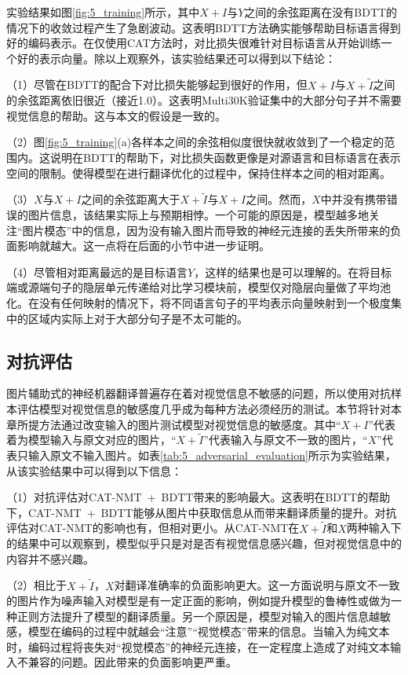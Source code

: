 实验结果如图\ref{fig:5_training}所示，其中$X+I$与$Y$之间的余弦距离在没有BDTT的情况下的收敛过程产生了急剧波动。这表明BDTT方法确实能够帮助目标语言得到好的编码表示。在仅使用CAT方法时，对比损失很难针对目标语言从开始训练一个好的表示向量。除以上观察外，该实验结果还可以得到以下结论：

（1）尽管在BDTT的配合下对比损失能够起到很好的作用，但$X+I$与$X+\tilde{I}$之间的余弦距离依旧很近（接近1.0）。这表明Multi30K验证集中的大部分句子并不需要视觉信息的帮助。这与本文的假设是一致的。

（2）图\ref{fig:5_training}(a)各样本之间的余弦相似度很快就收敛到了一个稳定的范围内。这说明在BDTT的帮助下，对比损失函数更像是对源语言和目标语言在表示空间的限制。使得模型在进行翻译优化的过程中，保持住样本之间的相对距离。

（3）$X$与$X+I$之间的余弦距离大于$X+\tilde{I}$与$X+I$之间。然而，$X$中并没有携带错误的图片信息，该结果实际上与预期相悖。一个可能的原因是，模型越多地关注“图片模态”中的信息，因为没有输入图片而导致的神经元连接的丢失所带来的负面影响就越大。这一点将在后面的小节中进一步证明。

（4）尽管相对距离最远的是目标语言$Y$，这样的结果也是可以理解的。在将目标端或源端句子的隐层单元传递给对比学习模块前，模型仅对隐层向量做了平均池化。在没有任何映射的情况下，将不同语言句子的平均表示向量映射到一个极度集中的区域内实际上对于大部分句子是不太可能的。

\subsection{对抗评估}
\label{sec:5_adversarial_evaluation}

图片辅助式的神经机器翻译普遍存在着对视觉信息不敏感的问题，所以使用对抗样本评估模型对视觉信息的敏感度几乎成为每种方法必须经历的测试。本节将针对本章所提方法通过改变输入的图片测试模型对视觉信息的敏感度。其中“$X+I$”代表着为模型输入与原文对应的图片，“$X+\tilde{I}$”代表输入与原文不一致的图片，“$X$”代表只输入原文不输入图片。如表\ref{tab:5_adversarial_evaluation}所示为实验结果，从该实验结果中可以得到以下信息：

（1）对抗评估对CAT-NMT~+~BDTT带来的影响最大。这表明在BDTT的帮助下，CAT-NMT~+~BDTT能够从图片中获取信息从而带来翻译质量的提升。对抗评估对CAT-NMT的影响也有，但相对更小。从CAT-NMT在$X+\tilde{I}$和$X$两种输入下的结果中可以观察到，模型似乎只是对是否有视觉信息感兴趣，但对视觉信息中的内容并不感兴趣。

（2）相比于$X+\tilde{I}$，$X$对翻译准确率的负面影响更大。这一方面说明与原文不一致的图片作为噪声输入对模型是有一定正面的影响，例如提升模型的鲁棒性或做为一种正则方法提升了模型的翻译质量。另一个原因是，模型对输入的图片信息越敏感，模型在编码的过程中就越会“注意”“视觉模态”带来的信息。当输入为纯文本时，编码过程将丧失对“视觉模态”的神经元连接，在一定程度上造成了对纯文本输入不兼容的问题。因此带来的负面影响更严重。

